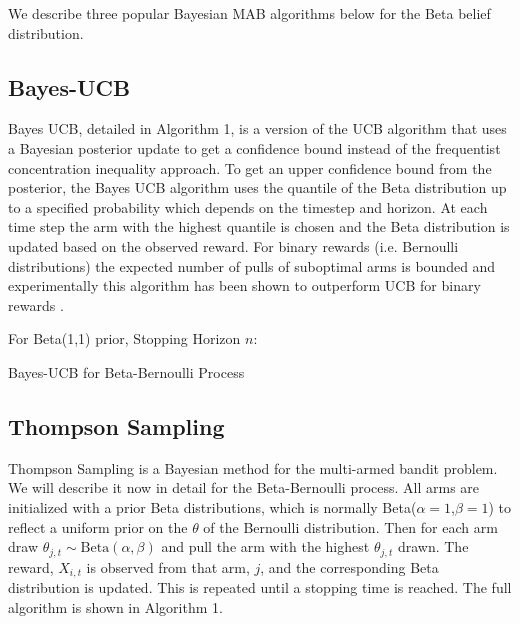 \documentclass[journal,transmag]{IEEEtran}%
\begin{document}
We describe three popular Bayesian MAB algorithms below for the Beta belief distribution.

\subsection{Bayes-UCB}
Bayes UCB, detailed in Algorithm 1, is a version of the UCB algorithm that uses a Bayesian posterior update to get a confidence bound instead of  the frequentist concentration inequality approach. To get an upper confidence bound from the posterior, the Bayes UCB algorithm uses the quantile of the Beta distribution up to a specified probability which depends on the timestep and horizon. At each time step the arm with the highest quantile is chosen and the Beta distribution is updated based on the observed reward.  For binary rewards (i.e. Bernoulli distributions) the expected number of pulls of suboptimal arms is bounded and experimentally this algorithm has been shown to outperform UCB for binary rewards \cite{kaufmann2012bayesian}.

\begin{algorithm}
 For Beta(1,1) prior, Stopping Horizon $n$: \\
 \caption{Bayes-UCB for Beta-Bernoulli Process}
\end{algorithm}


\subsection{Thompson Sampling}
Thompson Sampling is a Bayesian method for the multi-armed bandit problem. We will describe it now in detail for the Beta-Bernoulli process. All arms are initialized with a prior Beta distributions, which is normally Beta($\alpha=1$,$\beta =1$) to reflect a uniform prior on the $\theta$ of the Bernoulli distribution. Then for each arm draw $\theta_{j,t} \sim \mbox{Beta}(\alpha,\beta)$ and pull the arm with the highest $\theta_{j,t}$ drawn. The reward, $X_{i,t}$ is observed from that arm, $j$, and the corresponding Beta distribution is updated. This is repeated until a stopping time is reached. The full algorithm is shown in Algorithm 1.  
\end{document}
